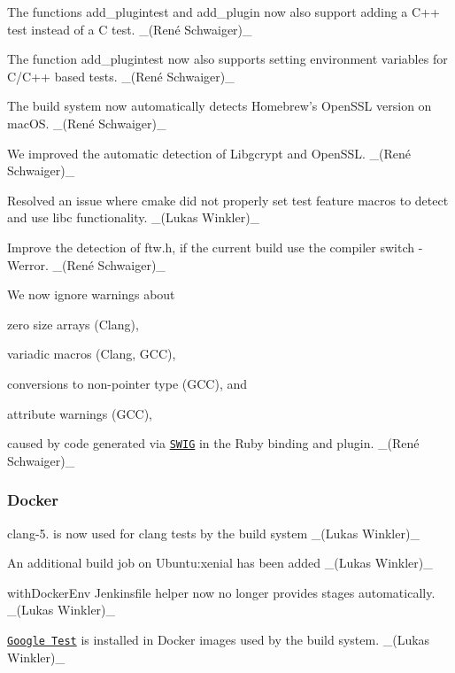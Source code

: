\begin{DoxyItemize}
\item The functions {\ttfamily add\+\_\+plugintest} and {\ttfamily add\+\_\+plugin} now also support adding a C++ test instead of a C test. \+\_\+(René Schwaiger)\+\_\+
\item The function {\ttfamily add\+\_\+plugintest} now also supports setting environment variables for C/\+C++ based tests. \+\_\+(René Schwaiger)\+\_\+
\item The build system now automatically detects Homebrew’s Open\+S\+SL version on mac\+OS. \+\_\+(René Schwaiger)\+\_\+
\item We improved the automatic detection of Libgcrypt and Open\+S\+SL. \+\_\+(René Schwaiger)\+\_\+
\item Resolved an issue where cmake did not properly set test feature macros to detect and use libc functionality. \+\_\+(\+Lukas Winkler)\+\_\+
\item Improve the detection of {\ttfamily ftw.\+h}, if the current build use the compiler switch {\ttfamily -\/\+Werror}. \+\_\+(René Schwaiger)\+\_\+
\item We now ignore warnings about
\begin{DoxyItemize}
\item zero size arrays (Clang),
\item variadic macros (Clang, G\+CC),
\item conversions to non-\/pointer type (G\+CC), and
\item attribute warnings (G\+CC),
\end{DoxyItemize}

caused by code generated via \href{http://www.swig.org}{\tt S\+W\+IG} in the Ruby binding and plugin. \+\_\+(René Schwaiger)\+\_\+
\end{DoxyItemize}

\subsubsection*{Docker}


\begin{DoxyItemize}
\item {\ttfamily clang-\/5.} is now used for clang tests by the build system \+\_\+(\+Lukas Winkler)\+\_\+
\item An additional build job on Ubuntu\+:xenial has been added \+\_\+(\+Lukas Winkler)\+\_\+
\item {\ttfamily with\+Docker\+Env} Jenkinsfile helper now no longer provides stages automatically. \+\_\+(\+Lukas Winkler)\+\_\+
\item \href{https://github.com/google/googletest}{\tt Google Test} is installed in Docker images used by the build system. \+\_\+(\+Lukas Winkler)\+\_\+
\end{DoxyItemize}

